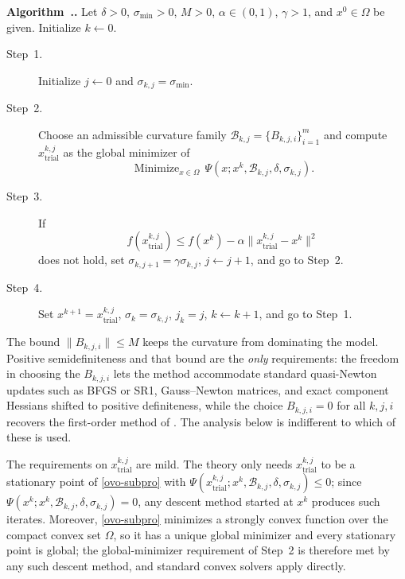 \documentclass[11pt]{article}
\newcommand{\xkjtrial}{x^{k,j}_{\mathrm{trial}}}
\newcommand{\minimize}{\mathop{\text{Minimize}}}
\newcounter{alg}[section]
\renewcommand{\thealg}{\thesection.\arabic{alg}}
\begin{document}
\medskip
\noindent{}\label{alg:main}\textbf{Algorithm~\thealg.} Let $\delta > 0$,
$\sigma_{\min} > 0$, $M > 0$, $\alpha \in (0,1)$, $\gamma > 1$, and
$x^0 \in \Omega$ be given. Initialize $k \leftarrow 0$.
\begin{description}
\item[Step~1.] Initialize $j \leftarrow 0$ and $\sigma_{k,j} = \sigma_{\min}$.
\item[Step~2.] Choose an admissible curvature family
$\mathcal{B}_{k,j} = \{B_{k,j,i}\}_{i=1}^{m}$ and compute
$\xkjtrial$ as the global minimizer of
    \begin{equation} \label{ovo-subpro}
    \minimize_{x \in \Omega}\, \Psi(x; x^k, \mathcal{B}_{k,j}, \delta, \sigma_{k,j}).
    \end{equation}
\item[Step~3.] If
    \begin{equation} \label{ovo-armijo}
    f(\xkjtrial) \leq f(x^k) - \alpha \|\xkjtrial - x^k\|^2
    \end{equation}
does not hold, set $\sigma_{k,j+1} = \gamma \sigma_{k,j}$,
$j \leftarrow j + 1$, and go to Step~2.
\item[Step~4.] Set $x^{k+1} = \xkjtrial$, $\sigma_k = \sigma_{k,j}$,
$j_k = j$, $k \leftarrow k+1$, and go to Step~1.
\end{description}

The bound $\|B_{k,j,i}\| \leq M$ keeps the curvature from dominating the model.
Positive semidefiniteness and that bound are the \emph{only} requirements: the
freedom in choosing the $B_{k,j,i}$ lets the method accommodate standard
quasi-Newton updates such as BFGS or SR1, Gauss--Newton matrices, and exact
component Hessians shifted to positive definiteness, while the choice
$B_{k,j,i} = 0$ for all $k, j, i$ recovers the first-order method of
\cite{alvarezovo}. The analysis below is indifferent to which of these is used.

The requirements on $\xkjtrial$ are mild. The theory only needs $\xkjtrial$ to
be a stationary point of \eqref{ovo-subpro} with
$\Psi(\xkjtrial; x^k, \mathcal{B}_{k,j}, \delta, \sigma_{k,j}) \leq 0$; since
$\Psi(x^k; x^k, \mathcal{B}_{k,j}, \delta, \sigma_{k,j}) = 0$, any descent method started
at $x^k$ produces such iterates. Moreover, \eqref{ovo-subpro} minimizes a
strongly convex function over the compact convex set $\Omega$, so it has a
unique global minimizer and every stationary point is global; the
global-minimizer requirement of Step~2 is therefore met by any such descent
method, and standard convex solvers apply directly.
\end{document}

